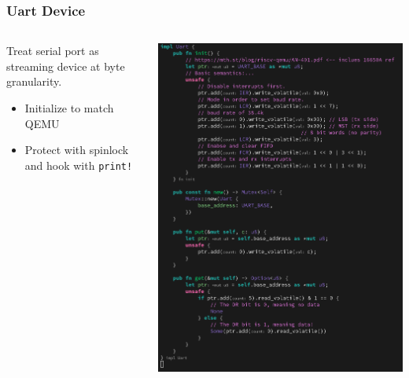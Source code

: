 \documentclass{beamer}
\begin{document}
\begin{frame}[fragile]
  \frametitle{Uart Device}
  \begin{columns}
    \begin{column}{0.5\textwidth}
      Treat serial port as streaming device at byte granularity.
      \begin{itemize}
      \item Initialize to match QEMU\\
      \item Protect with spinlock and hook with \verb_print!_
      \end{itemize}
    \end{column}
    \begin{column}{0.5\textwidth}
      \includegraphics[width=\textwidth]{uart.png}
    \end{column}
  \end{columns}
\end{frame}
\end{document}
